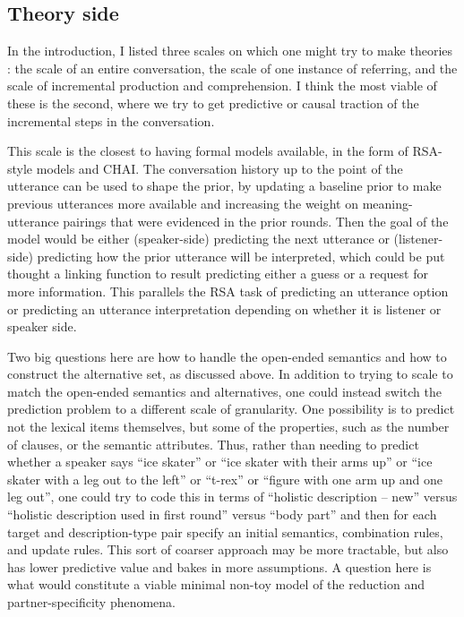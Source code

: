 \documentclass[]{article}
\begin{document}
	\subsection{Theory side}
	
	
	In the introduction, I listed three scales on which one might try to make theories%
	: the scale of an entire conversation, the scale of one instance of referring, and the scale of incremental production and comprehension. 
	I think the most viable of these is the second, where we try to get predictive or causal traction of the incremental steps in the conversation. 
	
	This scale is the closest to having formal models available, in the form of RSA-style models and CHAI. The conversation history up to the point of the utterance can be used to shape the prior, by updating a baseline prior to make previous utterances more available and increasing the weight on meaning-utterance pairings that were evidenced in the prior rounds. Then the goal of the model would be either (speaker-side) predicting the next utterance or (listener-side) predicting how the prior utterance will be interpreted, which could be put thought a linking function to result predicting either a guess or a request for more information. This parallels the RSA task of predicting an utterance option or predicting an utterance interpretation depending on whether it is listener or speaker side. 
	
	Two big questions here are how to handle the open-ended semantics and how to construct the alternative set, as discussed above. In addition to trying to scale to match the open-ended semantics and alternatives, one could instead switch the prediction problem to a different scale of granularity. One possibility is to predict not the lexical items themselves, but some of the properties, such as the number of clauses, or the semantic attributes. Thus, rather than needing to predict whether a speaker says ``ice skater'' or ``ice skater with their arms up'' or ``ice skater with a leg out to the left'' or ``t-rex'' or ``figure with one arm up and one leg out'', one could try to code this in terms of ``holistic description -- new'' versus ``holistic description used in first round'' versus ``body part'' and then for each target and description-type pair specify an initial semantics, combination rules, and update rules. This sort of coarser approach may be more tractable, but also has lower predictive value and bakes in more assumptions. A question here is what would constitute a viable minimal non-toy model of the reduction and partner-specificity phenomena. 
	
\end{document}
